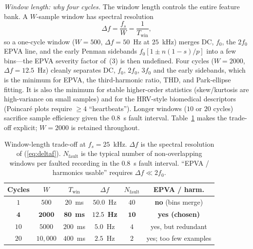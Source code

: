 \documentclass[journal]{IEEEtran}
\begin{document}
\emph{Window length: why four cycles.} The window length controls the entire feature
bank. A $W$-sample window has spectral resolution
\begin{equation}
\Delta f = \frac{f_s}{W} = \frac{1}{T_{\text{win}}},
\label{eq:deltaf}
\end{equation}
so a one-cycle window ($W{=}500$, $\Delta f = 50$~Hz at $25$~kHz) merges DC, $f_0$,
the $2f_0$ EPVA line, and the early Penman sidebands $f_0[1\!\pm\!n(1\!-\!s)/p]$ into a
few bins---the EPVA severity factor of~(3) is then undefined. Four cycles ($W{=}2000$,
$\Delta f = 12.5$~Hz) cleanly separates DC, $f_0$, $2f_0$, $3f_0$ and the early sidebands,
which is the minimum for EPVA, the third-harmonic ratio, THD, and Park-ellipse fitting.
It is also the minimum for stable higher-order statistics (skew/kurtosis are high-variance
on small samples) and for the HRV-style biomedical descriptors (Poincar\'{e} plots
require $\geq\!4$ ``heartbeats''). Longer windows ($10$ or $20$ cycles) sacrifice
sample efficiency given the $0.8$~s fault interval. Table~\ref{tab:window} makes the
trade-off explicit; $W{=}2000$ is retained throughout.

\begin{table}[!t]
\caption{Window-length trade-off at $f_s=25$~kHz. $\Delta f$ is the spectral resolution of (\ref{eq:deltaf}).
$N_{\text{fault}}$ is the typical number of non-overlapping windows per faulted recording in the $0.8$~s
fault interval. ``EPVA / harmonics usable'' requires $\Delta f \ll 2f_0$.}
\label{tab:window}
\centering
\footnotesize
\begin{tabular}{@{}cccccc@{}}
\toprule
Cycles & $W$ & $T_{\text{win}}$ & $\Delta f$ & $N_{\text{fault}}$ & EPVA / harm. \\
\midrule
$1$    & $500$    & $20$~ms  & $50.0$~Hz & $40$ & \textbf{no} (bins merge) \\
$\mathbf{4}$ & $\mathbf{2000}$ & $\mathbf{80}$~\textbf{ms} & $\mathbf{12.5}$~\textbf{Hz} & $\mathbf{10}$ & \textbf{yes (chosen)} \\
$10$   & $5000$   & $200$~ms & $5.0$~Hz & $4$  & yes, but redundant \\
$20$   & $10{,}000$ & $400$~ms & $2.5$~Hz & $2$  & yes; too few examples \\
\bottomrule
\end{tabular}
\end{table}
\end{document}
